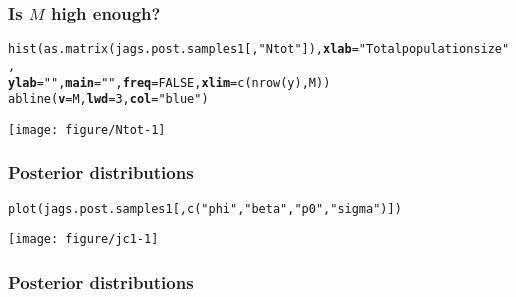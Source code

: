 \documentclass[color=usenames,dvipsnames]{beamer}\usepackage[]{graphicx}\usepackage[]{xcolor}
\makeatletter
\newcommand{\hlnum}[1]{\textcolor[rgb]{0.69,0.494,0}{#1}}%
\newcommand{\hlsng}[1]{\textcolor[rgb]{0.749,0.012,0.012}{#1}}%
\newcommand{\hldef}[1]{\textcolor[rgb]{0,0,0}{#1}}%
\newcommand{\hlkwc}[1]{\textcolor[rgb]{0,0,0}{\textbf{#1}}}%
\newcommand{\hlkwd}[1]{\textcolor[rgb]{0.004,0.004,0.506}{#1}}%
\newenvironment{kframe}{%
 \def\at@end@of@kframe{}%
 \ifinner\ifhmode%
  \def\at@end@of@kframe{\end{minipage}}%
  \begin{minipage}{\columnwidth}%
 \fi\fi%
 \def\FrameCommand##1{\hskip\@totalleftmargin \hskip-\fboxsep
 \colorbox{shadecolor}{##1}\hskip-\fboxsep
     \hskip-\linewidth \hskip-\@totalleftmargin \hskip\columnwidth}%
 \MakeFramed {\advance\hsize-\width
   \@totalleftmargin\z@ \linewidth\hsize
   \@setminipage}}%
 {\par\unskip\endMakeFramed%
 \at@end@of@kframe}
\newenvironment{knitrout}{}{} %
\makeatother
\begin{document}
\begin{frame}[fragile]
  \frametitle{Is $M$ high enough?}
\begin{knitrout}\tiny
{}\color{fgcolor}\begin{kframe}
\begin{alltt}
\hlkwd{hist}\hldef{(}\hlkwd{as.matrix}\hldef{(jags.post.samples1[,}\hlsng{"Ntot"}\hldef{]),} \hlkwc{xlab}\hldef{=}\hlsng{"Total population size"}\hldef{,}
     \hlkwc{ylab}\hldef{=}\hlsng{""}\hldef{,} \hlkwc{main}\hldef{=}\hlsng{""}\hldef{,} \hlkwc{freq}\hldef{=}\hlnum{FALSE}\hldef{,} \hlkwc{xlim}\hldef{=}\hlkwd{c}\hldef{(}\hlkwd{nrow}\hldef{(y), M))}
\hlkwd{abline}\hldef{(}\hlkwc{v}\hldef{=M,} \hlkwc{lwd}\hldef{=}\hlnum{3}\hldef{,} \hlkwc{col}\hldef{=}\hlsng{"blue"}\hldef{)}
\end{alltt}
\end{kframe}

{\centering \texttt{[image: figure/Ntot-1]} 

}


\end{knitrout}
\end{frame}






\begin{frame}[fragile]
  \frametitle{Posterior distributions}
\begin{knitrout}\scriptsize
{}\color{fgcolor}\begin{kframe}
\begin{alltt}
\hlkwd{plot}\hldef{(jags.post.samples1[,}\hlkwd{c}\hldef{(}\hlsng{"phi"}\hldef{,} \hlsng{"beta"}\hldef{,} \hlsng{"p0"}\hldef{,} \hlsng{"sigma"}\hldef{)])}
\end{alltt}
\end{kframe}

{\centering \texttt{[image: figure/jc1-1]} 

}


\end{knitrout}
\end{frame}






\begin{frame}[fragile]
  \frametitle{Posterior distributions}


\begin{center}
\end{center}
\end{frame}
\end{document}
